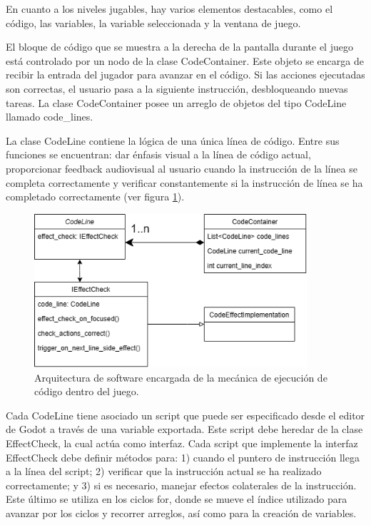 En cuanto a los niveles jugables, hay varios elementos destacables, como el código, las variables, la variable seleccionada y la ventana de juego.

El bloque de código que se muestra a la derecha de la pantalla durante el juego está controlado por un nodo de la clase CodeContainer. Este objeto se encarga de recibir la entrada del jugador para avanzar en el código. Si las acciones ejecutadas son correctas, el usuario pasa a la siguiente instrucción, desbloqueando nuevas tareas. La clase CodeContainer posee un arreglo de objetos del tipo CodeLine llamado code\_lines. 

La clase CodeLine contiene la lógica de una única línea de código. Entre sus funciones se encuentran: dar énfasis visual a la línea de código actual, proporcionar feedback audiovisual al usuario cuando la instrucción de la línea se completa correctamente y verificar constantemente si la instrucción de línea se ha completado correctamente (ver figura \ref{CodeLinesArchitecture}).

\begin{figure}[h]
	\centering
	\includegraphics[width=0.9\textwidth]{imagenes/code_lines_architecture.png}
	\caption{Arquitectura de software encargada de la mecánica de ejecución de código dentro del juego.}
	\label{CodeLinesArchitecture}
\end{figure}

Cada CodeLine tiene asociado un script que puede ser especificado desde el editor de Godot a través de una variable exportada. Este script debe heredar de la clase EffectCheck, la cual actúa como interfaz. Cada script que implemente la interfaz EffectCheck debe definir métodos para: 1) cuando el puntero de instrucción llega a la línea del script; 2) verificar que la instrucción actual se ha realizado correctamente; y 3) si es necesario, manejar efectos colaterales de la instrucción. Este último se utiliza en los ciclos for, donde se mueve el índice utilizado para avanzar por los ciclos y recorrer arreglos, así como para la creación de variables.

